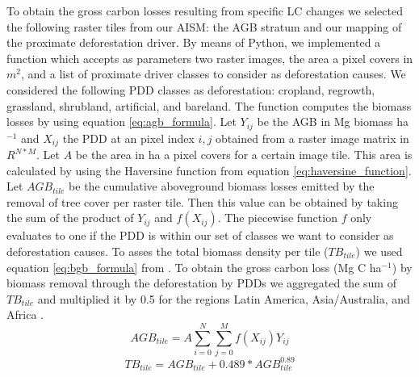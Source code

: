 		To obtain the gross carbon losses resulting from specific \ac{LC} changes we selected the following raster tiles from our \ac{AISM}: the \ac{AGB} stratum and our mapping of the proximate deforestation driver. By means of Python, we implemented a function which accepts as parameters two raster images, the area a pixel covers in $m^2$, and a list of proximate driver classes to consider as deforestation causes. We considered the following \ac{PDD} classes as deforestation: cropland, regrowth, grassland, shrubland, artificial, and bareland. The function computes the biomass losses by using equation \ref{eq:agb_formula}. Let $Y_{ij}$ be the \ac{AGB} in Mg biomass ha$^{-1}$ and $X_{ij}$ the \ac{PDD} at an pixel index $i,j$ obtained from a raster image matrix in $R^{N*M}$. Let $A$ be the area in ha a pixel covers for a certain image tile. This area is calculated by using the Haversine function from equation \ref{eq:haversine_function}. Let $AGB_{tile}$ be the cumulative aboveground biomass losses emitted by the removal of tree cover per raster tile. Then this value can be obtained by taking the sum of the product of $Y_{ij}$ and $f(X_{ij})$. The piecewise function $f$ only evaluates to one if the \ac{PDD} is within our set of classes we want to consider as deforestation causes. To asses the total biomass density per tile ($TB_{tile}$) we used equation \ref{eq:bgb_formula} from \citet{Saatchi2011}. To obtain the gross carbon loss (Mg C ha$^{-1}$) by biomass removal through the deforestation by \acp{PDD} we aggregated the sum of $TB_{tile}$ and multiplied it by 0.5 for the regions Latin America, Asia/Australia, and Africa \citep{Achard2014}.
		\begin{equation}
		\label{eq:agb_formula}
			AGB_{tile} = A\displaystyle\sum_{i=0}^{N}\displaystyle\sum_{j=0}^{M} f(X_{ij})Y_{ij}
		\end{equation}
		\begin{equation}
		\label{eq:bgb_formula}
			TB_{tile} = AGB_{tile} + 0.489*AGB_{tile}^{0.89}
		\end{equation}

